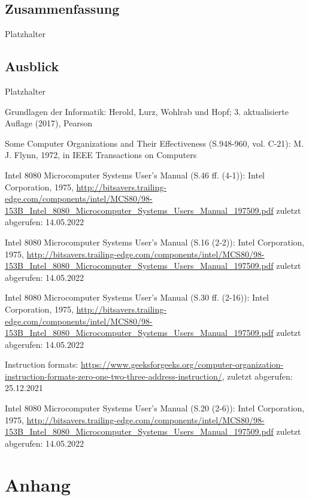 \documentclass[12pt]{article}
\newcounter{applabelno}
\newcommand{\applabel}[1]{\refstepcounter{applabelno}\label{#1}}
\begin{document}
\subsection{Zusammenfassung}
Platzhalter

\subsection{Ausblick}
Platzhalter

\newpage


\begin{thebibliography}{9}

Grundlagen der Informatik: Herold, Lurz, Wohlrab und Hopf; 3. aktualisierte Auflage (2017), Pearson

Some Computer Organizations and Their Effectiveness (S.948-960, vol. C-21): M. J. Flynn, 1972, in IEEE Transactions on Computers

Intel 8080 Microcomputer Systems User's Manual (S.46 ff. (4-1)): Intel Corporation, 1975, \url{http://bitsavers.trailing-edge.com/components/intel/MCS80/98-153B_Intel_8080_Microcomputer_Systems_Users_Manual_197509.pdf} zuletzt abgerufen: 14.05.2022

Intel 8080 Microcomputer Systems User's Manual (S.16 (2-2)): Intel Corporation, 1975, \url{http://bitsavers.trailing-edge.com/components/intel/MCS80/98-153B_Intel_8080_Microcomputer_Systems_Users_Manual_197509.pdf} zuletzt abgerufen: 14.05.2022

Intel 8080 Microcomputer Systems User's Manual (S.30 ff. (2-16)): Intel Corporation, 1975, \url{http://bitsavers.trailing-edge.com/components/intel/MCS80/98-153B_Intel_8080_Microcomputer_Systems_Users_Manual_197509.pdf} zuletzt abgerufen: 14.05.2022

Instruction formats: \url{https://www.geeksforgeeks.org/computer-organization-instruction-formats-zero-one-two-three-address-instruction/}, zuletzt abgerufen: 25.12.2021

Intel 8080 Microcomputer Systems User's Manual (S.20 (2-6)): Intel Corporation, 1975, \url{http://bitsavers.trailing-edge.com/components/intel/MCS80/98-153B_Intel_8080_Microcomputer_Systems_Users_Manual_197509.pdf} zuletzt abgerufen: 14.05.2022

\end{thebibliography}

\newpage
\thispagestyle{empty}


\appendix
\section*{Anhang}

\applabel{anhang:instr_state}

\end{document}
